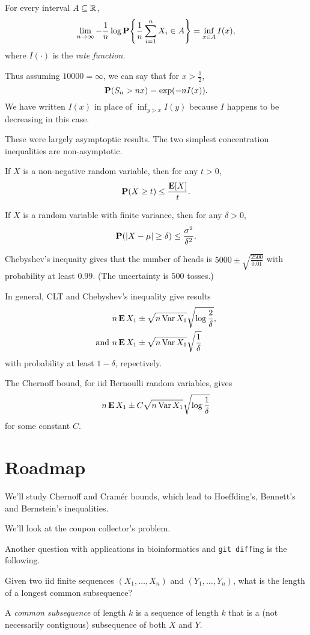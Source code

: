 \begin{theorem} \label{thm:ldev}
    For every interval $A \subseteq \R$, \[
        \lim_{n \to \infty} -\frac1n \log \P\set*{\frac1n \sum_{i=1}^n X_i \in A}
            = \inf_{x \in A} I(x),
    \] where $I(\cdot)$ is the \emph{rate function}.
\end{theorem}
Thus assuming $10000 = \infty$, we can say that for $x > \frac12$, \[
    \P(S_n > n x) = \exp(-n I(x)).
\] We have written $I(x)$ in place of $\inf_{y > x} I(y)$ because $I$
happens to be decreasing in this case.

These were largely asymptoptic results.
The two simplest concentration inequalities are non-asymptotic.
\begin{theorem}
    If $X$ is a non-negative random variable, then for any $t > 0$, \[
        \P(X \ge t) \le \frac{\E[X]}{t}.
    \]
\end{theorem}
\begin{theorem} \label{thm:cheby}
    If $X$ is a random variable with finite variance,
    then for any $\delta > 0$, \[
        \P(\abs{X - \mu} \ge \delta) \le \frac{\sigma^2}{\delta^2}.
    \]
\end{theorem}
Chebyshev's inequaity gives that the number of heads is
$5000 \pm \sqrt{\frac{2500}{0.01}}$ with probability at least $0.99$.
(The uncertainty is $500$ tosses.)

In general, CLT and Chebyshev's inequality give results \begin{align*}
    &n \E X_1 \pm \sqrt{n \Var X_1} \sqrt{\log \frac2\delta}, \\
    \text{and } &n \E X_1 \pm \sqrt{n \Var X_1} \sqrt{\frac1\delta}
\end{align*}
with probability at least $1 - \delta$, repectively.

The Chernoff bound, for iid Bernoulli random variables, gives \[
    n \E X_1 \pm C \sqrt{n \Var X_1} \sqrt{\log \frac1\delta}
\] for some constant $C$.

\section*{Roadmap}
We'll study Chernoff and Cram\'er bounds, which lead to Hoeffding's,
Bennett's and Bernstein's inequalities.

We'll look at the coupon collector's problem.

Another question with applications in bioinformatics and
\texttt{git diff}ing is the following.
\begin{question}
    Given two iid finite sequences $(X_1, \dots, X_n)$ and
    $(Y_1, \dots, Y_n)$, what is the length of a longest common subsequence?

    A \emph{common subsequence} of length $k$ is a sequence of length $k$
    that is a (not necessarily contiguous) subsequence of both $X$ and $Y$.
\end{question}

